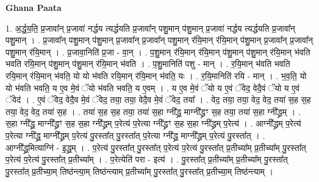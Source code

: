 \documentclass[17pt]{extarticle}
\begin{document}
\textbf{Ghana Paata } \newline

1. अ॒र्द्ध॒य॒ति॒ प्र॒जावा᳚न् प्र॒जावा॑ नर्द्धय त्यर्द्धयति प्र॒जावा᳚न् पशु॒मान् प॑शु॒मान् प्र॒जावा॑ नर्द्धय त्यर्द्धयति प्र॒जावा᳚न् पशु॒मान् । . प्र॒जावा᳚न् पशु॒मान् प॑शु॒मान् प्र॒जावा᳚न् प्र॒जावा᳚न् पशु॒मान् र॑यि॒मान् र॑यि॒मान् प॑शु॒मान् प्र॒जावा᳚न् प्र॒जावा᳚न् पशु॒मान् र॑यि॒मान् । . प्र॒जावा॒निति॑ प्र॒जा - वा॒न् । . प॒शु॒मान् र॑यि॒मान् र॑यि॒मान् प॑शु॒मान् प॑शु॒मान् र॑यि॒मान् भ॑वति भवति रयि॒मान् प॑शु॒मान् प॑शु॒मान् र॑यि॒मान् भ॑वति । . प॒शु॒मानिति॑ पशु - मान् । . र॒यि॒मान् भ॑वति भवति रयि॒मान् र॑यि॒मान् भ॑वति॒ यो यो भ॑वति रयि॒मान् र॑यि॒मान् भ॑वति॒ यः । . र॒यि॒मानिति॑ रयि - मान् । . भ॒व॒ति॒ यो यो भ॑वति भवति॒ य ए॒व मे॒वं ॅयो भ॑वति भवति॒ य ए॒वम् । . य ए॒व मे॒वं ॅयो य ए॒वं ॅवेद॒ वेदै॒वं ॅयो य ए॒वं ॅवेद॑ । . ए॒वं ॅवेद॒ वेदै॒व मे॒वं ॅवेद॒ तया॒ तया॒ वेदै॒व मे॒वं ॅवेद॒ तया᳚ । . वेद॒ तया॒ तया॒ वेद॒ वेद॒ तया॑ स॒ह स॒ह तया॒ वेद॒ वेद॒ तया॑ स॒ह । . तया॑ स॒ह स॒ह तया॒ तया॑ स॒हा ग्नी᳚द्ध्र॒ माग्नी᳚द्ध्रꣳ स॒ह तया॒ तया॑ स॒हा ग्नी᳚द्ध्रम् । . स॒हा ग्नी᳚द्ध्र॒ माग्नी᳚द्ध्रꣳ स॒ह स॒हा ग्नी᳚द्ध्रम् प॒रेत्य॑ प॒रेत्या ग्नी᳚द्ध्रꣳ स॒ह स॒हा ग्नी᳚द्ध्रम् प॒रेत्य॑ । . आग्नी᳚द्ध्रम् प॒रेत्य॑ प॒रेत्या ग्नी᳚द्ध्र॒ माग्नी᳚द्ध्रम् प॒रेत्य॑ पु॒रस्ता᳚त् पु॒रस्ता᳚त् प॒रेत्या ग्नी᳚द्ध्र॒ माग्नी᳚द्ध्रम् प॒रेत्य॑ पु॒रस्ता᳚त् । . आग्नी᳚द्ध्र॒मित्याग्नि॑ - इ॒द्ध्र॒म् । . प॒रेत्य॑ पु॒रस्ता᳚त् पु॒रस्ता᳚त् प॒रेत्य॑ प॒रेत्य॑ पु॒रस्ता᳚त् प्र॒तीच्या᳚म् प्र॒तीच्या᳚म् पु॒रस्ता᳚त् प॒रेत्य॑ प॒रेत्य॑ पु॒रस्ता᳚त् प्र॒तीच्या᳚म् । . प॒रेत्येति॑ परा - इत्य॑ । . पु॒रस्ता᳚त् प्र॒तीच्या᳚म् प्र॒तीच्या᳚म् पु॒रस्ता᳚त् पु॒रस्ता᳚त् प्र॒तीच्या॒म् तिष्ठ॑न्त्या॒म् तिष्ठ॑न्त्याम् प्र॒तीच्या᳚म् पु॒रस्ता᳚त् पु॒रस्ता᳚त् प्र॒तीच्या॒म् तिष्ठ॑न्त्याम् । \newline
\end{document}
